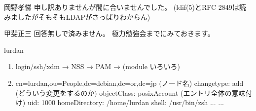 \documentclass[mingoth,a4paper]{jsarticle}
\begin{document}
\begin{prework}{ 岡野孝悌 }
申し訳ありませんが間に合いませんでした。
(ldif(5)とRFC 2849は読みましたがそもそもLDAPがさっぱりわからん)
\end{prework}

\begin{prework}{ 甲斐正三 }
回答無しで済みません。
極力勉強会までにみておきます。
\end{prework}

\begin{prework}{ lurdan }
  \begin{enumerate}
  \item login/ssh/xdm → NSS → PAM → (module いろいろ)
  \item
    \begin{commandline}
      cn=lurdan,ou=People,dc=debian,dc=or,dc=jp (ノード名)
      changetype: add (どういう変更をするのか)
      objectClass: posixAccount (エントリ全体の意味付け)
      uid: 1000
      homeDirectory: /home/lurdan
      shell: /usr/bin/zsh
      ...
      ...
    \end{commandline}
  \end{enumerate}
\end{prework}
\end{document}
